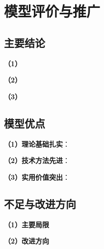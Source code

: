 \chapter[\hspace{0pt}模型评价与推广]{{\heiti{}\hspace{0pt}模型评价与推广}}\label{chapter4: 模型评价与推广}
\removelofgap
\removelotgap

\section[\hspace{-2pt}主要结论]{{\heiti{} \hspace{-8pt}主要结论}}\label{section5: 主要结论}


\noindent\textbf{（1）}


\noindent\textbf{（2）}


\noindent\textbf{（3）}


\section[\hspace{-2pt}模型优点]{{\heiti{} \hspace{-8pt}模型优点}}\label{section5: 模型优点}

\noindent\textbf{（1）理论基础扎实}：

\noindent\textbf{（2）技术方法先进}：

\noindent\textbf{（3）实用价值突出}：

\section[\hspace{-2pt}不足与改进方向]{{\heiti{} \hspace{-8pt}不足与改进方向}}\label{section5: 不足与改进方向}

\noindent\textbf{（1）主要局限}


\noindent\textbf{（2）改进方向}

